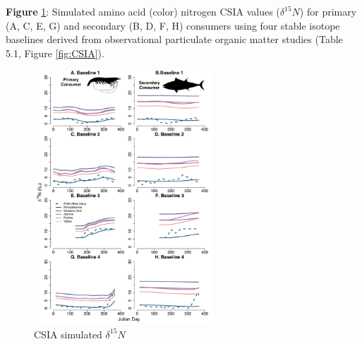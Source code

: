 \documentclass [11pt, proquest] {uwthesis}[2015/03/03]
\begin{document}
\textbf{Figure} \ref{fig:CSIA15N}: Simulated amino acid (color) nitrogen
CSIA values (\(\delta^{15}N\)) for primary (A, C, E, G) and secondary
(B, D, F, H) consumers using four stable isotope baselines derived from
observational particulate organic matter studies (Table 5.1, Figure
\ref{fig:CSIA}). \newline 
\begin{figure}[h]
\centering
  \includegraphics[width=0.6\textwidth]{figure/Ch5/Figure6.pdf}
  \caption{CSIA simulated $\delta^{15}N$}
  \label{fig:CSIA15N}
\end{figure}
\clearpage
\end{document}
